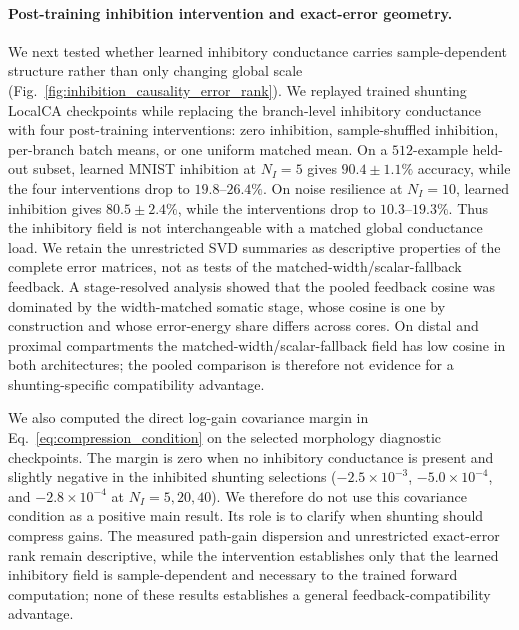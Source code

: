     \paragraph{Post-training inhibition intervention and exact-error geometry.}
    We next tested whether learned inhibitory conductance carries sample-dependent structure rather than only changing global scale (Fig.~\ref{fig:inhibition_causality_error_rank}). We replayed trained shunting LocalCA checkpoints while replacing the branch-level inhibitory conductance with four post-training interventions: zero inhibition, sample-shuffled inhibition, per-branch batch means, or one uniform matched mean. On a $512$-example held-out subset, learned MNIST inhibition at $N_I{=}5$ gives $90.4\pm1.1\%$ accuracy, while the four interventions drop to $19.8$--$26.4\%$. On noise resilience at $N_I{=}10$, learned inhibition gives $80.5\pm2.4\%$, while the interventions drop to $10.3$--$19.3\%$. Thus the inhibitory field is not interchangeable with a matched global conductance load. We retain the unrestricted SVD summaries as descriptive properties of the complete error matrices, not as tests of the matched-width/scalar-fallback feedback. A stage-resolved analysis showed that the pooled feedback cosine was dominated by the width-matched somatic stage, whose cosine is one by construction and whose error-energy share differs across cores. On distal and proximal compartments the matched-width/scalar-fallback field has low cosine in both architectures; the pooled comparison is therefore not evidence for a shunting-specific compatibility advantage.
    
    We also computed the direct log-gain covariance margin in Eq.~\eqref{eq:compression_condition} on the selected morphology diagnostic checkpoints. The margin is zero when no inhibitory conductance is present and slightly negative in the inhibited shunting selections ($-2.5\times10^{-3}$, $-5.0\times10^{-4}$, and $-2.8\times10^{-4}$ at $N_I{=}5,20,40$). We therefore do not use this covariance condition as a positive main result. Its role is to clarify when shunting should compress gains. The measured path-gain dispersion and unrestricted exact-error rank remain descriptive, while the intervention establishes only that the learned inhibitory field is sample-dependent and necessary to the trained forward computation; none of these results establishes a general feedback-compatibility advantage.
    
